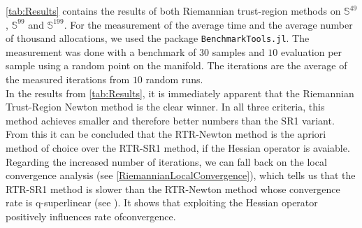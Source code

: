 \cref{tab:Results} contains the results of both Riemannian trust-region methods on $\mathbb{S}^{49}$, $\mathbb{S}^{99}$ and $\mathbb{S}^{199}$. For the measurement of the average time and the average number of thousand allocations, we used the package \lstinline!BenchmarkTools.jl!. The measurement was done with a benchmark of $30$ samples and $10$ evaluation per sample using a random point on the manifold. The iterations are the average of the measured iterations from $10$ random runs. \\
In the results from \cref{tab:Results}, it is immediately apparent that the Riemannian Trust-Region Newton method is the clear winner. In all three criteria, this method achieves smaller and therefore better numbers than the SR1 variant. From this it can be concluded that the RTR-Newton method is the apriori method of choice over the RTR-SR1 method, if the Hessian operator is avaiable. \\
Regarding the increased number of iterations, we can fall back on the local convergence analysis (see \cref{RiemannianLocalConvergence}), which tells us that the RTR-SR1 method is slower than the RTR-Newton method whose convergence rate is q-superlinear (see \cite[Theorem~4.13]{AbsilBakerGallivan:2007}). It shows that exploiting the Hessian operator positively influences rate ofconvergence. \\ 
